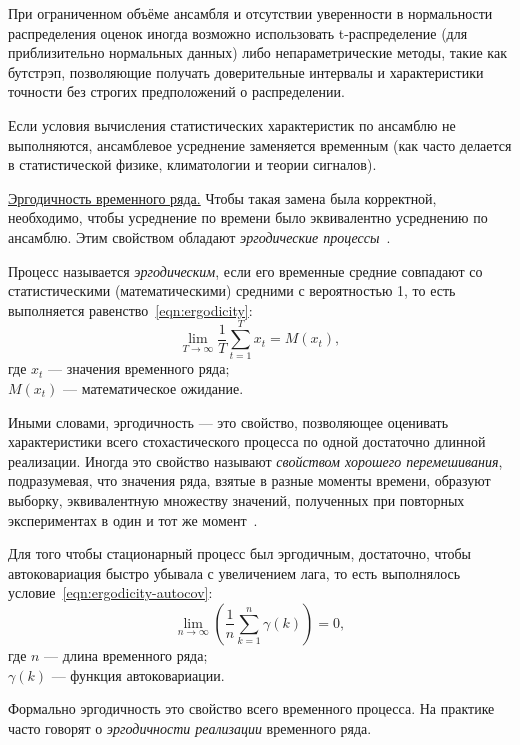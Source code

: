 При ограниченном объёме ансамбля и отсутствии уверенности в нормальности распределения оценок иногда возможно использовать t-распределение (для приблизительно нормальных данных) либо непараметрические методы, такие как бутстрэп, позволяющие получать доверительные интервалы и характеристики точности без строгих предположений о распределении.

Если условия вычисления статистических характеристик по ансамблю не выполняются, ансамблевое усреднение заменяется временным (как часто делается в статистической физике, климатологии и теории сигналов).

\ul{Эргодичность временного ряда.} Чтобы такая замена была корректной, необходимо, чтобы усреднение по времени было эквивалентно усреднению по ансамблю. Этим свойством обладают \textit{эргодические процессы}~\cite{BorovkovErgodicity, VolkovRandomProcesses}.

Процесс называется \textit{эргодическим}, если его временные средние совпадают со статистическими (математическими) средними с вероятностью 1, то есть выполняется равенство~\eqref{eqn:ergodicity}:
\begin{equation}
\label{eqn:ergodicity}
\lim_{T \to \infty} \frac{1}{T} \sum_{t=1}^{T} x_t = M(x_t),
\end{equation}
где $x_t$ --- значения временного ряда;\\
${}$\quad\enspace$M(x_t)$ --- математическое ожидание.

Иными словами, эргодичность --- это свойство, позволяющее оценивать характеристики всего стохастического процесса по одной достаточно длинной реализации. Иногда это свойство называют \textit{свойством хорошего перемешивания}, подразумевая, что значения ряда, взятые в разные моменты времени, образуют выборку, эквивалентную множеству значений, полученных при повторных экспериментах в один и тот же момент~\cite{BrockwellDavis2016}.

Для того чтобы стационарный процесс был эргодичным, достаточно, чтобы автоковариация быстро убывала с увеличением лага, то есть выполнялось условие~\eqref{eqn:ergodicity-autocov}:
\begin{equation}
\label{eqn:ergodicity-autocov}
\lim_{n \to \infty} \left( \frac{1}{n} \sum_{k=1}^{n} \gamma(k) \right) = 0,
\end{equation}
где $n$ --- длина временного ряда;\\
${}$\quad\enspace$\gamma(k)$ — функция автоковариации.

Формально эргодичность это свойство всего временного процесса. На практике часто говорят о \textit{эргодичности реализации} временного ряда.

